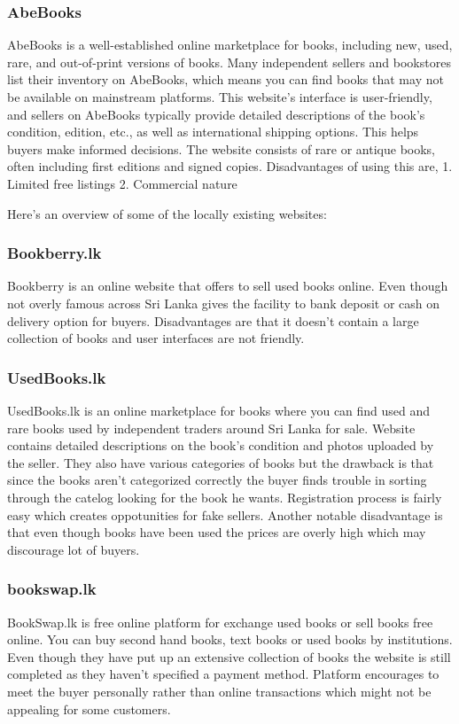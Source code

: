 \subsubsection{AbeBooks}
AbeBooks is a well-established online marketplace for books, including new, used, rare, and out-of-print versions of books. Many independent sellers and bookstores list their inventory on AbeBooks, which means you can find books that may not be available on mainstream platforms. This website's interface is user-friendly, and sellers on AbeBooks typically provide detailed descriptions of the book's condition, edition, etc., as well as international shipping options. This helps buyers make informed decisions. The website consists of rare or antique books, often including first editions and signed copies. Disadvantages of using this are,
1. Limited free listings
2. Commercial nature

Here's an overview of some of the locally existing websites:

\subsubsection{Bookberry.lk}
Bookberry is an online website that offers to sell used books online. Even though not overly famous across Sri Lanka gives the facility to bank deposit or cash on delivery option for buyers. Disadvantages are that it doesn't contain a large collection of books and user interfaces are not friendly. 

\subsubsection{UsedBooks.lk}
UsedBooks.lk is an online marketplace for books where you can find used and rare books used by independent traders around Sri Lanka for sale.
Website contains detailed descriptions on the book's condition and photos uploaded by the seller. They also have various categories of books but the drawback is that since the books aren't categorized correctly the buyer finds trouble in sorting through the catelog looking for the book he wants. Registration process is fairly easy which creates oppotunities for fake sellers. Another notable disadvantage is that even though books have been used the prices are overly high which may discourage lot of buyers. 

\subsubsection{bookswap.lk}
BookSwap.lk is free online platform for exchange used books or sell books free online. You can buy second hand books, text books or used books by institutions. Even though they have put up an extensive collection of books the website is still completed as they haven't specified a payment method. Platform encourages to meet the buyer personally rather than online transactions which might not be appealing for some customers. 


